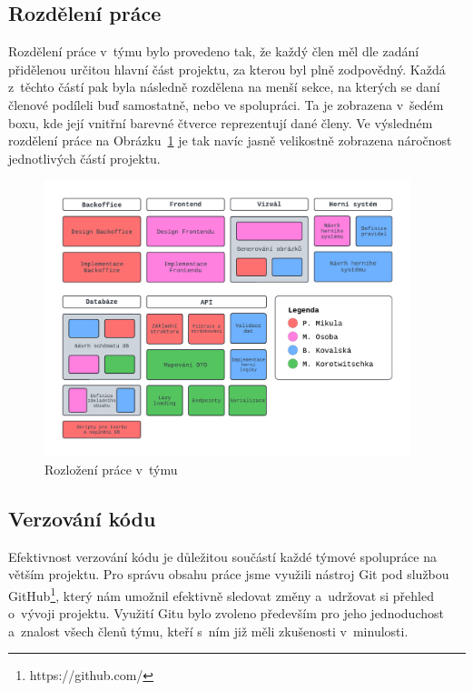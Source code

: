 \subsection{Rozdělení práce}
\label{subsec:implementation-collaboration-distribution}
Rozdělení práce v~týmu bylo provedeno tak, že každý člen měl dle zadání přidělenou určitou hlavní část projektu, za kterou byl plně zodpovědný. Každá z~těchto částí pak byla následně rozdělena na menší sekce, na kterých se daní členové podíleli buď samostatně, nebo ve spolupráci. Ta je zobrazena v~šedém boxu, kde její vnitřní barevné čtverce reprezentují dané členy. Ve výsledném rozdělení práce na Obrázku~\ref{fig:job_distribution} je tak navíc jasně velikostně zobrazena náročnost jednotlivých částí projektu.

\begin{figure}[H]
    \centering
    \includegraphics[width=0.95\textwidth]{../../shared/diagrams/blocks}
    \caption{Rozložení práce v~týmu}
    \label{fig:job_distribution}
\end{figure}

\subsection{Verzování kódu}
\label{subsec:implementation-collaboration-versioning}
Efektivnost verzování kódu je důležitou součástí každé týmové spolupráce na větším projektu. Pro správu obsahu práce jsme využili nástroj Git pod službou GitHub\footnote{https://github.com/}, který nám umožnil efektivně sledovat změny a~udržovat si přehled o~vývoji projektu. Využití Gitu bylo zvoleno především pro jeho jednoduchost a~znalost všech členů týmu, kteří s~ním již měli zkušenosti v~minulosti.

